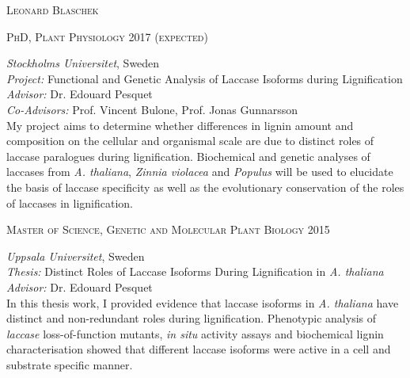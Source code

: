 \documentclass[11pt]{article}
\begin{document}
	\setlength\parindent{15pt}
\begin{center}
	\huge{\textsc{Leonard Blaschek}}
	\vspace*{0.3cm}
\end{center}

\vspace{0.1cm}

\textsc{\large{PhD, Plant Physiology} \hfill \textsc{2017 \textnormal{(expected)}}}
\begin{addmargin}[24pt]{0pt}
	\textit{Stockholms Universitet}, Sweden \\
	\textit{Project:} Functional and Genetic Analysis of Laccase Isoforms during Lignification \\
	\textit{Advisor:} Dr. Edouard Pesquet \\
	\textit{Co-Advisors:} Prof. Vincent Bulone, Prof. Jonas Gunnarsson
	\vspace{0.1cm} \\
	\small{My project aims to determine whether differences in lignin amount and composition on the cellular and organismal scale are due to distinct roles of laccase paralogues during lignification. Biochemical and genetic analyses of laccases from \textit{A. thaliana}, \textit{Zinnia violacea} and \textit{Populus} will be used to elucidate the basis of laccase specificity as well as the evolutionary conservation of the roles of laccases in lignification.}
\end{addmargin}
\vspace{0.2cm}

\textsc{\large{Master of Science, Genetic and Molecular Plant Biology} \hfill \textsc{2015}}
\begin{addmargin}[24pt]{0pt}
	\textit{Uppsala Universitet}, Sweden \\
	\textit{Thesis:} Distinct Roles of Laccase Isoforms During Lignification in \textit{ A. thaliana}\\
	\textit{Advisor:} Dr. Edouard Pesquet
	\vspace{0.1cm} \\
	\small{In this thesis work, I provided evidence that laccase isoforms in \textit{A. thaliana} have distinct and non-redundant roles during lignification. Phenotypic analysis of \textit{laccase} loss-of-function mutants, \textit{in situ} activity assays and biochemical lignin characterisation showed that different laccase isoforms were active in a cell and substrate specific manner.}
\end{addmargin}
\vspace{0.2cm}
\end{document}
